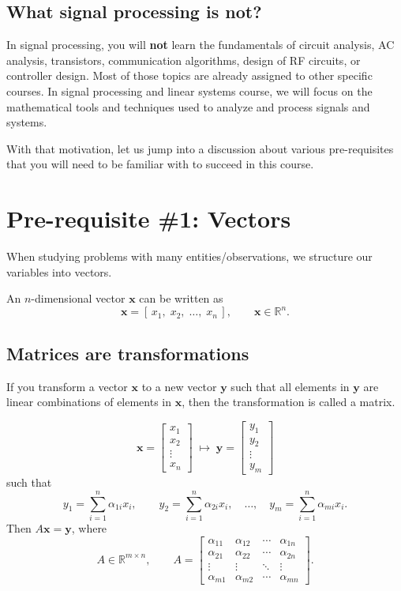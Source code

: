 \subsection{What signal processing is not?}
In signal processing, you will \textbf{not} learn the fundamentals of circuit analysis, AC analysis, transistors, communication algorithms, design of RF circuits, or controller design. Most of those topics are already assigned to other specific courses. In signal processing and linear systems course, we will focus on the mathematical tools and techniques used to analyze and process signals and systems.

With that motivation, let us jump into a discussion about various pre-requisites that you will need to be familiar with to succeed in this course.
\section{Pre-requisite \#1: Vectors}
When studying problems with many entities/observations, we structure our variables into vectors.

An $n$-dimensional vector $\mathbf{x}$ can be written as
\[
\mathbf{x}=[\,x_1,\;x_2,\;\ldots,\;x_n\,], \qquad \mathbf{x}\in\mathbb{R}^n .
\]

\subsection{Matrices are transformations}
If you transform a vector $\mathbf{x}$ to a new vector $\mathbf{y}$ such that all elements in $\mathbf{y}$ are linear combinations of elements in $\mathbf{x}$, then the transformation is called a matrix.

\[
\mathbf{x}=
\begin{bmatrix}
x_1\\ x_2\\ \vdots\\ x_n
\end{bmatrix}
\;\longmapsto\;
\mathbf{y}=
\begin{bmatrix}
y_1\\ y_2\\ \vdots\\ y_m
\end{bmatrix}
\]
such that
\[
y_1=\sum_{i=1}^{n}\alpha_{1i}x_i,\qquad
y_2=\sum_{i=1}^{n}\alpha_{2i}x_i,\quad \ldots,\quad
y_m=\sum_{i=1}^{n}\alpha_{mi}x_i .
\]
Then $A\mathbf{x}=\mathbf{y}$, where
\[
A\in\mathbb{R}^{m\times n}, \qquad
A=
\begin{bmatrix}
\alpha_{11} & \alpha_{12} & \cdots & \alpha_{1n}\\
\alpha_{21} & \alpha_{22} & \cdots & \alpha_{2n}\\
\vdots      & \vdots      & \ddots & \vdots\\
\alpha_{m1} & \alpha_{m2} & \cdots & \alpha_{mn}
\end{bmatrix}.
\]

